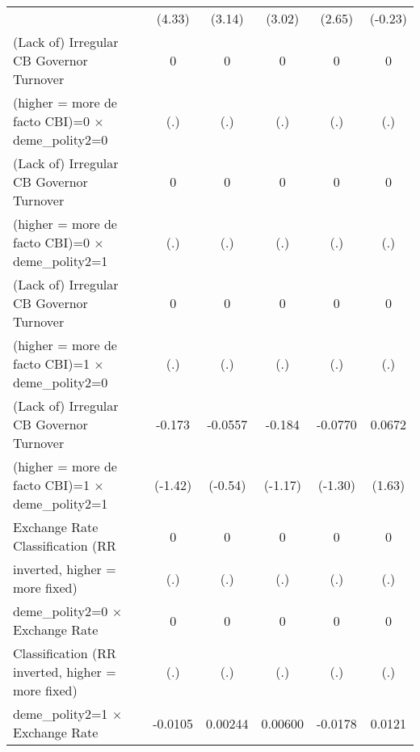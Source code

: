 {\begin{tabular}{l*{5}{c}}
                                        &   (4.33)         &   (3.14)         &   (3.02)         &   (2.65)         &  (-0.23)         \\
\addlinespace
(Lack of) Irregular CB Governor Turnover&        0         &        0         &        0         &        0         &        0         \\
(higher = more de facto CBI)=0 $\times$ deme\_polity2=0&      (.)         &      (.)         &      (.)         &      (.)         &      (.)         \\
\addlinespace
(Lack of) Irregular CB Governor Turnover&        0         &        0         &        0         &        0         &        0         \\
(higher = more de facto CBI)=0 $\times$ deme\_polity2=1&      (.)         &      (.)         &      (.)         &      (.)         &      (.)         \\
\addlinespace
(Lack of) Irregular CB Governor Turnover&        0         &        0         &        0         &        0         &        0         \\
(higher = more de facto CBI)=1 $\times$ deme\_polity2=0&      (.)         &      (.)         &      (.)         &      (.)         &      (.)         \\
\addlinespace
(Lack of) Irregular CB Governor Turnover&   -0.173         &  -0.0557         &   -0.184         &  -0.0770         &   0.0672         \\
(higher = more de facto CBI)=1 $\times$ deme\_polity2=1&  (-1.42)         &  (-0.54)         &  (-1.17)         &  (-1.30)         &   (1.63)         \\
\addlinespace
Exchange Rate Classification (RR        &        0         &        0         &        0         &        0         &        0         \\
inverted, higher = more fixed)          &      (.)         &      (.)         &      (.)         &      (.)         &      (.)         \\
\addlinespace
deme\_polity2=0 $\times$ Exchange Rate   &        0         &        0         &        0         &        0         &        0         \\
Classification (RR inverted, higher = more fixed)&      (.)         &      (.)         &      (.)         &      (.)         &      (.)         \\
\addlinespace
deme\_polity2=1 $\times$ Exchange Rate   &  -0.0105         &  0.00244         &  0.00600         &  -0.0178         &   0.0121         \\

\end{tabular}}
